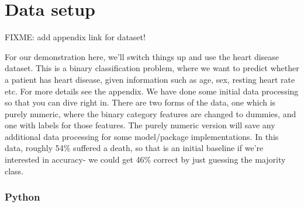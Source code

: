 \documentclass[
  letterpaper,
]{krantz}
\begin{document}
\section{Data setup}\label{data-setup-1}

FIXME: add appendix link for dataset!

For our demonstration here, we'll switch things up and use the heart
disease dataset. This is a binary classification problem, where we want
to predict whether a patient has heart disease, given information such
as age, sex, resting heart rate etc. For more details see the appendix.
We have done some initial data processing so that you can dive right in.
There are two forms of the data, one which is purely numeric, where the
binary category features are changed to dummies, and one with labels for
those features. The purely numeric version will save any additional data
processing for some model/package implementations. In this data, roughly
54\% suffered a death, so that is an initial baseline if we're
interested in accuracy- we could get 46\% correct by just guessing the
majority class.

\subsubsection{Python}
\end{document}
